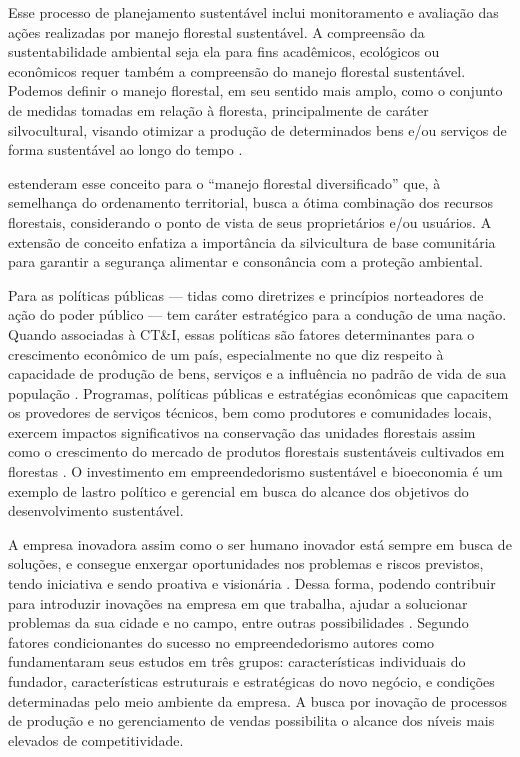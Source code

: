Esse processo de planejamento sustentável inclui monitoramento e avaliação das ações realizadas por manejo florestal sustentável. 
A compreensão da sustentabilidade ambiental seja ela para fins acadêmicos, ecológicos ou econômicos requer também a compreensão do manejo florestal sustentável. Podemos definir o manejo florestal, em seu sentido mais amplo, como o conjunto de medidas tomadas em relação à floresta, principalmente de caráter silvocultural, visando otimizar a produção de determinados bens e/ou serviços de forma sustentável ao longo do tempo \cite{Rosot2010ManejoAraucaria}.


 estenderam esse conceito para o “manejo florestal diversificado” que, à semelhança do ordenamento territorial, busca a ótima combinação dos recursos florestais, considerando o ponto de vista de seus proprietários e/ou usuários. A extensão de conceito enfatiza a importância da silvicultura de base comunitária para garantir a segurança alimentar e consonância com a proteção ambiental.

Para  as políticas públicas — tidas como diretrizes e princípios norteadores de ação do poder público — tem caráter estratégico para a condução de uma nação. Quando associadas à CT\&I, essas políticas são fatores determinantes para o crescimento econômico de um país, especialmente no que diz respeito à capacidade de produção de bens, serviços e a influência no padrão de vida de sua população \cite{Corazza2004}. Programas, políticas públicas e estratégias econômicas que capacitem os provedores de serviços técnicos, bem como produtores e comunidades locais, exercem impactos significativos na conservação das unidades florestais assim como o crescimento do mercado de produtos florestais sustentáveis cultivados em florestas \cite{Trozzo2021ForestIn}. O investimento em empreendedorismo sustentável e bioeconomia é um exemplo de  lastro político e gerencial em busca do alcance dos objetivos do desenvolvimento sustentável.


A empresa inovadora assim como o ser humano inovador está sempre em busca de soluções, e consegue enxergar oportunidades nos problemas e riscos previstos, tendo iniciativa e sendo proativa e visionária \cite{Milian2020}. Dessa forma, podendo contribuir para introduzir inovações na empresa em que trabalha, ajudar a solucionar problemas da sua cidade e no campo, entre outras possibilidades \cite{Alencar2019,Loiola2016}. Segundo  fatores condicionantes do sucesso no empreendedorismo autores como fundamentaram seus estudos em três grupos: características individuais do fundador, características estruturais e estratégicas do novo negócio, e condições determinadas pelo meio ambiente da empresa. A busca por inovação de processos de produção e no gerenciamento de vendas possibilita o alcance dos níveis mais elevados de competitividade. 

